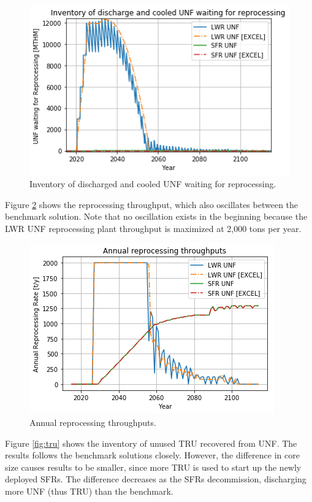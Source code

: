 \begin{figure}[htbp!]
    \begin{center}
        \includegraphics[scale=0.5]{./images/results_18/waiting_monthly.png}
    \end{center}
        \caption{Inventory of discharged and cooled \gls{UNF} waiting for reprocessing.}
    \label{fig:waiting_monthly}
\end{figure}


Figure \ref{fig:rep} shows the reprocessing throughput, which also oscillates between
the benchmark solution. Note that no oscillation exists in the beginning because the
\gls{LWR} \gls{UNF} reprocessing plant throughput is maximized at 2,000 tons per year.

\begin{figure}[htbp!]
    \begin{center}
        \includegraphics[scale=0.5]{./images/results_18/rep.png}
    \end{center}
        \caption{Annual reprocessing throughputs.}
    \label{fig:rep}
\end{figure}


Figure \ref{fig:tru} shows the inventory of unused \gls{TRU} recovered from \gls{UNF}.
The \Cyclus results follows the benchmark solutions closely. However, the difference
in core size causes \Cyclus results to be smaller, since more \gls{TRU} is used to
start up the newly deployed \glspl{SFR}. The difference decreases as the
\glspl{SFR} decommission, discharging more \gls{UNF} (thus \gls{TRU}) than
the benchmark.

